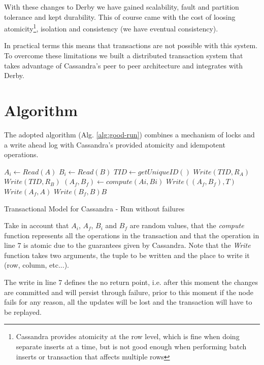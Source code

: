 With these changes to Derby we have gained scalability, fault and partition tolerance and kept durability. This of course came with the cost of loosing atomicity\footnote{Cassandra provides atomicity at the row level, which is fine when doing separate inserts at a time, but is not good enough when performing batch inserts or transaction that affects multiple rows}, isolation and consistency (we have eventual consistency). 

In practical terms this means that transactions are not possible with this system. To overcome these limitations we built a distributed transaction system that takes advantage of Cassandra's peer to peer architecture and integrates with Derby.

\section{Algorithm}
The adopted algorithm (Alg. \ref{alg:good-run}) combines a mechanism of locks and a write ahead log with Cassandra's provided atomicity and idempotent operations.

\begin{algorithm}  
  \DontPrintSemicolon
   
  \Indp
    $A_{i} \gets Read(A)$ \;
    $B_{i} \gets Read(B)$ \;
    $TID \gets getUniqueID()$ \; 
    $Write(TID,R_{A})$ 
    $Write(TID,R_{B})$ \;
    $(A_{f},B_{f}) \gets compute(Ai,Bi)$ \;
    $Write((A_{f},B_{f}),T)$ 
    $Write(A_{f},A)$ \;
    $Write(B_{f},B)B$ \;
  \Indm
 \caption{Transactional Model for Cassandra - Run without failures}
 \label{alg:good-run}
\end{algorithm}

Take in account that $A_{i}$, $A_{f}$, $B_{i}$ and $B_{f}$ are random values, that the \emph{compute} function represents all the operations in the transaction and that the operation in line 7 is atomic due to the guarantees given by Cassandra. Note that the \emph{Write} function takes two arguments, the tuple to be written and the place to write it (row, column, etc...). 

The write in line 7 defines the no return point, i.e. after this moment the changes are committed and will persist through failure, prior to this moment if the node fails for any reason, all the updates will be lost and the transaction will have to be replayed.

